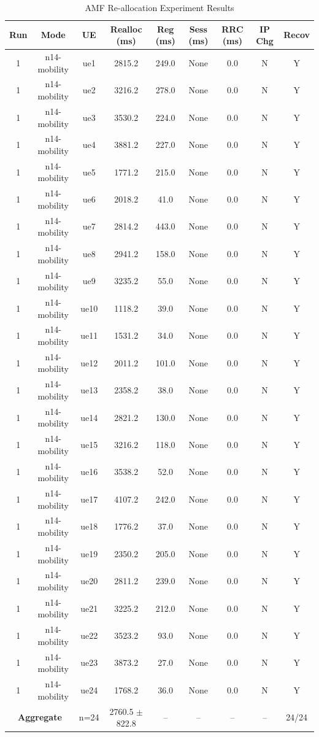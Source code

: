 \begin{table}[ht]
\centering
\begin{tabular}{|c|c|c|c|c|c|c|c|c|}
\hline
Run & Mode & UE & Realloc (ms) & Reg (ms) & Sess (ms) & RRC (ms) & IP Chg & Recov \\
\hline
1 & n14-mobility & ue1 & 2815.2 & 249.0 & None & 0.0 & N & Y \\
1 & n14-mobility & ue2 & 3216.2 & 278.0 & None & 0.0 & N & Y \\
1 & n14-mobility & ue3 & 3530.2 & 224.0 & None & 0.0 & N & Y \\
1 & n14-mobility & ue4 & 3881.2 & 227.0 & None & 0.0 & N & Y \\
1 & n14-mobility & ue5 & 1771.2 & 215.0 & None & 0.0 & N & Y \\
1 & n14-mobility & ue6 & 2018.2 & 41.0 & None & 0.0 & N & Y \\
1 & n14-mobility & ue7 & 2814.2 & 443.0 & None & 0.0 & N & Y \\
1 & n14-mobility & ue8 & 2941.2 & 158.0 & None & 0.0 & N & Y \\
1 & n14-mobility & ue9 & 3235.2 & 55.0 & None & 0.0 & N & Y \\
1 & n14-mobility & ue10 & 1118.2 & 39.0 & None & 0.0 & N & Y \\
1 & n14-mobility & ue11 & 1531.2 & 34.0 & None & 0.0 & N & Y \\
1 & n14-mobility & ue12 & 2011.2 & 101.0 & None & 0.0 & N & Y \\
1 & n14-mobility & ue13 & 2358.2 & 38.0 & None & 0.0 & N & Y \\
1 & n14-mobility & ue14 & 2821.2 & 130.0 & None & 0.0 & N & Y \\
1 & n14-mobility & ue15 & 3216.2 & 118.0 & None & 0.0 & N & Y \\
1 & n14-mobility & ue16 & 3538.2 & 52.0 & None & 0.0 & N & Y \\
1 & n14-mobility & ue17 & 4107.2 & 242.0 & None & 0.0 & N & Y \\
1 & n14-mobility & ue18 & 1776.2 & 37.0 & None & 0.0 & N & Y \\
1 & n14-mobility & ue19 & 2350.2 & 205.0 & None & 0.0 & N & Y \\
1 & n14-mobility & ue20 & 2811.2 & 239.0 & None & 0.0 & N & Y \\
1 & n14-mobility & ue21 & 3225.2 & 212.0 & None & 0.0 & N & Y \\
1 & n14-mobility & ue22 & 3523.2 & 93.0 & None & 0.0 & N & Y \\
1 & n14-mobility & ue23 & 3873.2 & 27.0 & None & 0.0 & N & Y \\
1 & n14-mobility & ue24 & 1768.2 & 36.0 & None & 0.0 & N & Y \\
\multicolumn{2}{|c|}{\textbf{Aggregate}} & n=24 & 2760.5 $\pm$ 822.8 & -- & -- & -- & -- & 24/24 \\
\hline
\end{tabular}
\caption{AMF Re-allocation Experiment Results}
\label{tab:amf_realloc}
\end{table}
